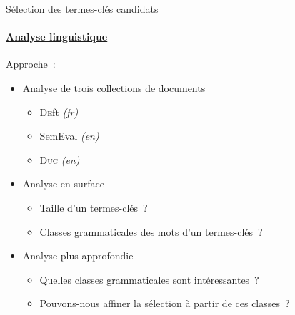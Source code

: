 \begin{frame}[label=selection_des_candidats]{Sélection des termes-clés candidats}\framesubtitle{\hyperlink{selection_des_candidats_back}{Analyse linguistique}}
  Approche~:
  \begin{itemize}
    \item{Analyse de trois collections de documents}
    \begin{itemize}
      \item{\textsc{De}ft \textit{(fr)}}
      \item{SemEval \textit{(en)}}
      \item{\textsc{Duc} \textit{(en)}}
    \end{itemize}
    \item{Analyse en surface}
    \begin{itemize}
      \item{Taille d'un termes-clés~?}
      \item{Classes grammaticales des mots d'un termes-clés~?}
    \end{itemize}
    \item{Analyse plus approfondie}
    \begin{itemize}
      \item{Quelles classes grammaticales sont intéressantes~?}
      \item{Pouvons-nous affiner la sélection à partir de ces classes~?}
    \end{itemize}
  \end{itemize}
\end{frame}
